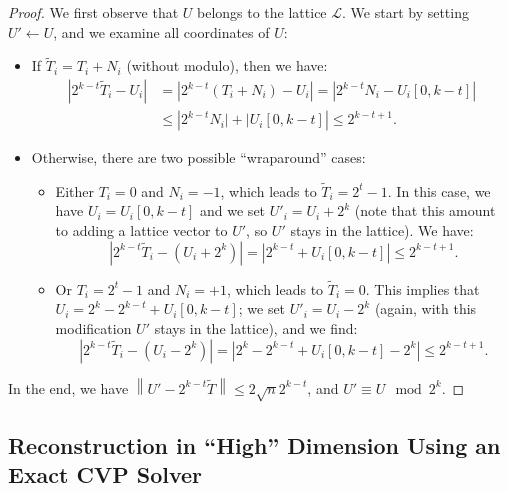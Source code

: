 \documentclass[journal=tosc,final]{iacrtrans}
\begin{document}
\begin{proof}
  We first observe that $U$ belongs to the lattice $\mathcal{L}$. We start by setting $U' \gets U$, and we examine all coordinates of $U$:
  \begin{itemize}
  \item If $\widetilde{T}_i = T_i + N_i$ (without modulo), then we have:
    \begin{align*}
      \left| 2^{k-t}\widetilde{T}_i-U_i \right| &= \left| 2^{k-t}(T_i + N_i)-U_i \right| 
                                                     = \left| 2^{k-t}N_i - U_i[0,k-t] \right| \\
                                                   &\leq \left| 2^{k-t}N_i\rvert + \lvert U_i[0,k-t] \right| 
      \leq 2^{k-t +1 }.
    \end{align*}
    
  \item Otherwise, there are two possible ``wraparound'' cases:
    \begin{itemize}
    \item Either $T_i = 0$ and $N_i = -1$, which leads to $\widetilde{T}_i = 2^t-1$. 
      In this case, we have $U_i = U_i[0,k-t]$ and we set $U'_i = U_i + 2^{k}$ (note that this amount to adding a lattice vector to $U'$, so $U'$ stays in the lattice). We have:
      \[
        \left| 2^{k-t}\widetilde{T}_i-(U_i + 2^k) \right| = %
        \left| 2^{k-t} + U_i[0,k-t]\right| \leq 2^{k-t + 1}. 
      \]
      
    \item Or $T_i = 2^{t}-1$ and $N_i = +1$, which leads to
      $\widetilde{T}_i = 0$.  This implies that
      $U_i= 2^k-2^{k-t} + U_i[0,k-t]$; we set $U'_i = U_i - 2^k$ (again,
      with this modification $U'$ stays in the lattice), and we find:
      \[
        \left| 2^{k-t}\widetilde{T}_i-(U_i - 2^k) \right| %
        = \left| 2^k-2^{k-t} + U_i[0,k-t] - 2^k\right| \leq 2^{k-t + 1}.
      \]
    \end{itemize}
  \end{itemize}
  In the end, we have
  $\left\| U' -2^{k-t} \widetilde{T} \right\| \leq 2 \sqrt{n} 2^{k-t}$,
  and $U' \equiv U \mod 2^k $.
\end{proof}

\subsection{Reconstruction in ``High'' Dimension Using an Exact CVP Solver}
\label{sec:cvp_big}
\end{document}
